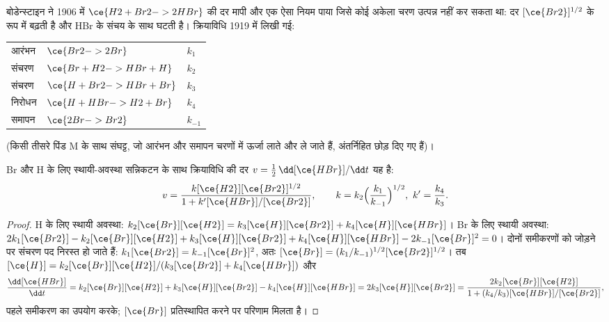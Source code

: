 बोडेन्स्टाइन ने 1906 में $\ce{H2 + Br2 -> 2 HBr}$ की दर मापी और एक ऐसा नियम पाया जिसे
कोई अकेला चरण उत्पन्न नहीं कर सकता था: दर $[\ce{Br2}]^{1/2}$ के रूप में बढ़ती है और HBr
के संचय के साथ घटती है। क्रियाविधि 1919 में लिखी गई:
\begin{center}
\begin{tabular}{lll}
आरंभन & $\ce{Br2 -> 2 Br}$ & $k_1$ \\
संचरण & $\ce{Br + H2 -> HBr + H}$ & $k_2$ \\
संचरण & $\ce{H + Br2 -> HBr + Br}$ & $k_3$ \\
निरोधन & $\ce{H + HBr -> H2 + Br}$ & $k_4$ \\
समापन & $\ce{2 Br -> Br2}$ & $k_{-1}$
\end{tabular}
\end{center}
(किसी तीसरे पिंड M के साथ संघट्ट, जो आरंभन और समापन चरणों में ऊर्जा
लाते और ले जाते हैं, अंतर्निहित छोड़ दिए गए हैं)।

\begin{theorem}[हाइड्रोजन--ब्रोमीन दर नियम]\label{thm:b3:complex-kinetics:hbr}
Br और H के लिए स्थायी-अवस्था सन्निकटन के साथ क्रियाविधि की दर
$v = \frac12\,\dd[\ce{HBr}]/\dd t$ यह है:
\[
  v = \frac{k[\ce{H2}][\ce{Br2}]^{1/2}}{1 + k'[\ce{HBr}]/[\ce{Br2}]},
  \qquad k = k_2\Bigl(\frac{k_1}{k_{-1}}\Bigr)^{1/2},\ k' = \frac{k_4}{k_3}.
\]
\end{theorem}

\begin{proof}
H के लिए स्थायी अवस्था: $k_2[\ce{Br}][\ce{H2}] = k_3[\ce{H}][\ce{Br2}] + k_4[\ce{H}][\ce{HBr}]$। Br के लिए स्थायी अवस्था:
$2k_1[\ce{Br2}] - k_2[\ce{Br}][\ce{H2}] + k_3[\ce{H}][\ce{Br2}] + k_4[\ce{H}][\ce{HBr}] - 2k_{-1}[\ce{Br}]^2 = 0$। दोनों
समीकरणों को जोड़ने पर संचरण पद निरस्त हो जाते हैं: $k_1[\ce{Br2}] = k_{-1}[\ce{Br}]^2$, अतः $[\ce{Br}] =
(k_1/k_{-1})^{1/2}[\ce{Br2}]^{1/2}$। तब $[\ce{H}] = k_2[\ce{Br}][\ce{H2}]/(k_3[\ce{Br2}] + k_4[\ce{HBr}])$ और
\[
  \frac{\dd[\ce{HBr}]}{\dd t} = k_2[\ce{Br}][\ce{H2}] + k_3[\ce{H}][\ce{Br2}] - k_4[\ce{H}][\ce{HBr}] = 2k_3[\ce{H}][\ce{Br2}]
  = \frac{2k_2[\ce{Br}][\ce{H2}]}{1 + (k_4/k_3)[\ce{HBr}]/[\ce{Br2}]},
\]
पहले समीकरण का उपयोग करके; $[\ce{Br}]$ प्रतिस्थापित करने पर परिणाम मिलता है।
\end{proof}

